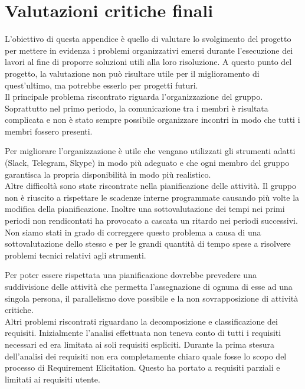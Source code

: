 {\begin{center}
\begin{tabular}{|c|c|c|}
		\hline
	\end{tabular}
\end{center}

\section{Valutazioni critiche finali}

L'obiettivo di questa appendice è quello di valutare lo svolgimento
del progetto per mettere in evidenza i problemi organizzativi emersi
durante l'esecuzione dei lavori al fine di proporre soluzioni utili
alla loro risoluzione. A questo punto del progetto, la valutazione non
può risultare utile per il miglioramento di quest'ultimo, ma potrebbe
esserlo per progetti futuri. \\ 

Il principale problema riscontrato riguarda l'organizzazione del
gruppo. Soprattutto nel primo periodo, la comunicazione tra i membri è
risultata complicata e non è stato sempre possibile organizzare
incontri in modo che tutti i membri fossero presenti.  

Per migliorare l'organizzazione è utile che vengano utilizzati gli
strumenti adatti (Slack, Telegram, Skype) in modo più adeguato e che
ogni membro del gruppo garantisca la propria disponibilità in modo più
realistico. \\ 
 
Altre difficoltà sono state riscontrate nella pianificazione delle attività. Il gruppo non è riuscito a rispettare le scadenze interne programmate causando più volte la modifica della pianificazione. 
Inoltre una sottovalutazione dei tempi nei primi periodi non
rendicontati ha provocato a cascata un ritardo nei periodi
successivi. Non siamo stati in grado di correggere questo problema a
causa di una sottovalutazione dello stesso e per le grandi quantità di
tempo spese a risolvere problemi tecnici relativi agli strumenti. 

Per poter essere rispettata una pianificazione dovrebbe prevedere una
suddivisione delle attività che permetta l'assegnazione di ognuna di
esse ad una singola persona, il parallelismo dove possibile e la non
sovrapposizione di attività critiche.   \\ 

Altri problemi riscontrati riguardano la decomposizione e
classificazione dei requisiti. Inizialmente l'analisi effettuata non
teneva conto di tutti i requisiti necessari ed era limitata ai soli
requisiti espliciti. Durante la prima stesura dell'analisi dei
requisiti non era completamente chiaro quale fosse lo scopo del
processo di Requirement Elicitation. Questo ha portato a requisiti
parziali e limitati ai requisiti utente.  

}
